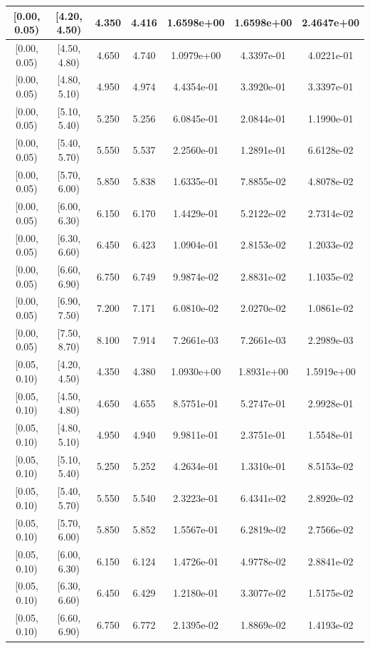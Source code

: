 \begin{longtable}{|c|c|c|c|c|c|c|}
\hline
\endlastfoot
[0.00, 0.05) & [4.20, 4.50) & 4.350 & 4.416 & 1.6598e+00 & 1.6598e+00 & 2.4647e+00 \\ 
\hline
[0.00, 0.05) & [4.50, 4.80) & 4.650 & 4.740 & 1.0979e+00 & 4.3397e-01 & 4.0221e-01 \\ 
\hline
[0.00, 0.05) & [4.80, 5.10) & 4.950 & 4.974 & 4.4354e-01 & 3.3920e-01 & 3.3397e-01 \\ 
\hline
[0.00, 0.05) & [5.10, 5.40) & 5.250 & 5.256 & 6.0845e-01 & 2.0844e-01 & 1.1990e-01 \\ 
\hline
[0.00, 0.05) & [5.40, 5.70) & 5.550 & 5.537 & 2.2560e-01 & 1.2891e-01 & 6.6128e-02 \\ 
\hline
[0.00, 0.05) & [5.70, 6.00) & 5.850 & 5.838 & 1.6335e-01 & 7.8855e-02 & 4.8078e-02 \\ 
\hline
[0.00, 0.05) & [6.00, 6.30) & 6.150 & 6.170 & 1.4429e-01 & 5.2122e-02 & 2.7314e-02 \\ 
\hline
[0.00, 0.05) & [6.30, 6.60) & 6.450 & 6.423 & 1.0904e-01 & 2.8153e-02 & 1.2033e-02 \\ 
\hline
[0.00, 0.05) & [6.60, 6.90) & 6.750 & 6.749 & 9.9874e-02 & 2.8831e-02 & 1.1035e-02 \\ 
\hline
[0.00, 0.05) & [6.90, 7.50) & 7.200 & 7.171 & 6.0810e-02 & 2.0270e-02 & 1.0861e-02 \\ 
\hline
[0.00, 0.05) & [7.50, 8.70) & 8.100 & 7.914 & 7.2661e-03 & 7.2661e-03 & 2.2989e-03 \\ 
\hline
[0.05, 0.10) & [4.20, 4.50) & 4.350 & 4.380 & 1.0930e+00 & 1.8931e+00 & 1.5919e+00 \\ 
\hline
[0.05, 0.10) & [4.50, 4.80) & 4.650 & 4.655 & 8.5751e-01 & 5.2747e-01 & 2.9928e-01 \\ 
\hline
[0.05, 0.10) & [4.80, 5.10) & 4.950 & 4.940 & 9.9811e-01 & 2.3751e-01 & 1.5548e-01 \\ 
\hline
[0.05, 0.10) & [5.10, 5.40) & 5.250 & 5.252 & 4.2634e-01 & 1.3310e-01 & 8.5153e-02 \\ 
\hline
[0.05, 0.10) & [5.40, 5.70) & 5.550 & 5.540 & 2.3223e-01 & 6.4341e-02 & 2.8920e-02 \\ 
\hline
[0.05, 0.10) & [5.70, 6.00) & 5.850 & 5.852 & 1.5567e-01 & 6.2819e-02 & 2.7566e-02 \\ 
\hline
[0.05, 0.10) & [6.00, 6.30) & 6.150 & 6.124 & 1.4726e-01 & 4.9778e-02 & 2.8841e-02 \\ 
\hline
[0.05, 0.10) & [6.30, 6.60) & 6.450 & 6.429 & 1.2180e-01 & 3.3077e-02 & 1.5175e-02 \\ 
\hline
[0.05, 0.10) & [6.60, 6.90) & 6.750 & 6.772 & 2.1395e-02 & 1.8869e-02 & 1.4193e-02 \\ 

\end{longtable}
